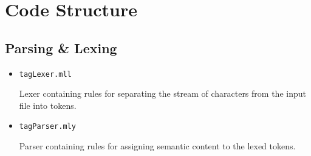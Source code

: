 \documentclass[10.5pt]{article}
\newcommand{\code}[1]{\texttt{#1}}
\begin{document}
\section{Code Structure}

%
%
%

\subsection{Parsing \& Lexing}
\begin{itemize}
	\item \code{tagLexer.mll}

	Lexer containing rules for separating the stream of characters from the input file into tokens.
	\item \code{tagParser.mly}

	Parser containing rules for assigning semantic content to the lexed tokens.
\end{itemize}
\end{document}

